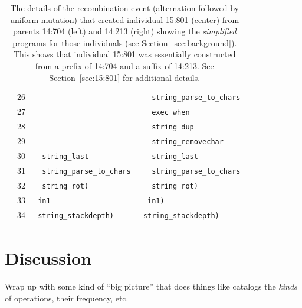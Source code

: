 \begin{table}
\begin{tabular}{l|rl|l}
& 26 &   & \texttt{ \ \ string\_parse\_to\_chars} \\
& 27 &   & \texttt{ \ \ exec\_when} \\ 
& 28 &   & \texttt{ \ \ string\_dup} \\
& 29 &   & \texttt{ \ \ string\_removechar} \\
& 30 & \texttt{ \ string\_last} & \texttt{ \ \ string\_last} \\
& 31 & \texttt{ \ string\_parse\_to\_chars} & \texttt{ \ \ string\_parse\_to\_chars} \\
& 32 & \texttt{ \ string\_rot)} & \texttt{ \ \ string\_rot)} \\
& 33 & \texttt{ in1} & \texttt{ \ in1)} \\
& 34 & \texttt{ string\_stackdepth)} & \texttt{ string\_stackdepth)} \\
\end{tabular}
\caption{The details of the recombination event (alternation followed by
	uniform mutation) that created individual
	15:801 (center) from parents 14:704 (left) and 14:213 (right) showing
	the \emph{simplified} programs for those individuals (see
	Section~\ref{sec:background}). This shows that individual 15:801 was
	essentially constructed from a prefix of 14:704 and a suffix of 14:213.
	See Section~\ref{sec:15:801} for additional details.}
\label{tab:15:801}
\end{table}

\section{Discussion}
\label{sec:discussion}

Wrap up with some kind of ``big picture'' that does things like catalogs the
\emph{kinds} of operations, their frequency, etc.







